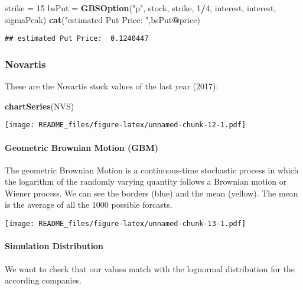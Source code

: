 \documentclass[]{article}
\newenvironment{Shaded}{\begin{snugshade}}{\end{snugshade}}
\newcommand{\KeywordTok}[1]{\textcolor[rgb]{0.13,0.29,0.53}{\textbf{#1}}}
\newcommand{\DecValTok}[1]{\textcolor[rgb]{0.00,0.00,0.81}{#1}}
\newcommand{\StringTok}[1]{\textcolor[rgb]{0.31,0.60,0.02}{#1}}
\newcommand{\OperatorTok}[1]{\textcolor[rgb]{0.81,0.36,0.00}{\textbf{#1}}}
\newcommand{\NormalTok}[1]{#1}
\let\oldparagraph\paragraph
\renewcommand{\paragraph}[1]{\oldparagraph{#1}\mbox{}}
\begin{document}
\begin{Shaded}
\begin{Highlighting}[]
\NormalTok{strike =}\StringTok{ }\DecValTok{15}
\NormalTok{bsPut =}\StringTok{ }\KeywordTok{GBSOption}\NormalTok{(}\StringTok{"p"}\NormalTok{, stock, strike, }\DecValTok{1}\OperatorTok{/}\DecValTok{4}\NormalTok{, interest, interest, sigmaPeak)}
\KeywordTok{cat}\NormalTok{(}\StringTok{"estimated Put Price: "}\NormalTok{,bsPut}\OperatorTok{@}\NormalTok{price)}
\end{Highlighting}
\end{Shaded}

\begin{verbatim}
## estimated Put Price:  0.1240447
\end{verbatim}

\subsubsection{Novartis}\label{novartis}

These are the Novartis stock values of the last year (2017):

\begin{Shaded}
\begin{Highlighting}[]
\KeywordTok{chartSeries}\NormalTok{(NVS)}
\end{Highlighting}
\end{Shaded}

\texttt{[image: README\_files/figure-latex/unnamed-chunk-12-1.pdf]}

\paragraph{Geometric Brownian Motion
(GBM)}\label{geometric-brownian-motion-gbm-2}

The geometric Brownian Motion is a continuous-time stochastic process in
which the logarithm of the randomly varying quantity follows a Brownian
motion or Wiener process. We can see the borders (blue) and the mean
(yellow). The mean is the average of all the 1000 possible forcasts.

\texttt{[image: README\_files/figure-latex/unnamed-chunk-13-1.pdf]}

\paragraph{Simulation Distribution}\label{simulation-distribution-2}

We want to check that our values match with the lognormal distribution
for the according companies.
\end{document}
